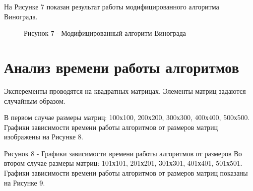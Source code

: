 \documentclass[12pt]{report}
\begin{document}
	\newpage
	На Рисунке 7 показан результат работы модифицированного алгоритма Винограда.
	\begin{figure}[h]
		\caption*{Рисунок 7 - Модифицированный алгоритм Винограда}
	\end{figure}
	
	
	\section{Анализ времени работы алгоритмов }
	Эксперементы проводятся на квадратных матрицах. Элементы матриц задаются случайным образом.\par
	В первом случае размеры матриц: 100х100, 200х200, 300х300, 400х400, 500х500. Графики зависимости времени работы алгоритмов от размеров матриц изображены на Рисунке 8.
	
	\par
	Рисунок 8 - Графики зависимости времени работы алгоритмов от размеров
	\newline\newline
	Во втором случае размеры матриц: 101х101, 201х201, 301х301, 401х401, 501х501. Графики зависимости времени работы алгоритмов от размеров матриц показаны на Рисунке 9.
	
\end{document}
